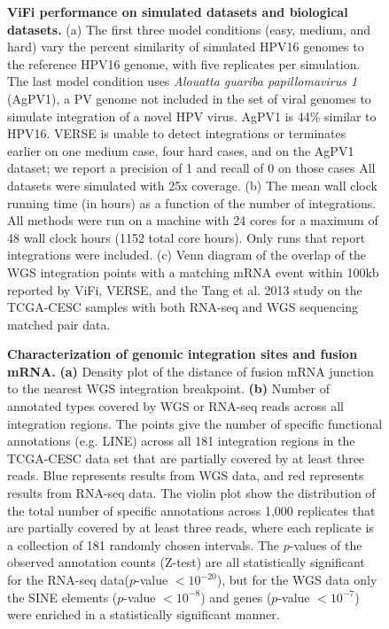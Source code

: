 \documentclass[a4,center,fleqn]{NAR}
\begin{document}
 \begin{figure}[htpb]
  \centering
\caption[ViFi performance simulated datasets.]  {\label{sim_results}
  {\bf ViFi performance on simulated datasets and biological
    datasets.}  (a) The first three model conditions (easy, medium,
  and hard) vary the percent similarity of simulated HPV16 genomes to
  the reference HPV16 genome, with five replicates per simulation.
  The last model condition uses \textit{Alouatta guariba
    papillomavirus 1} (AgPV1), a PV genome not included in the set of
  viral genomes to simulate integration of a novel HPV virus.  AgPV1 is
  44\% similar to HPV16.  VERSE is unable to detect integrations or
  terminates earlier on one medium case, four hard cases, and on the
  AgPV1 dataset; we report a precision of 1 and recall of 0 on those
  cases  All datasets were simulated with 25x coverage.  (b) The mean wall clock running time
  (in hours) as a function of the number of integrations.  All methods
  were run on a machine with 24 cores for a maximum of 48 wall clock hours (1152 total core hours).  Only
  runs that report integrations were included.  (c) Venn diagram of
  the overlap of the WGS integration points with a matching mRNA event
  within 100kb reported by ViFi, VERSE, and the Tang et al. 2013 study
  on the TCGA-CESC samples with both RNA-seq and WGS sequencing
  matched pair data.}
\end{figure}


\begin{figure}[htpb]
  \centering
  \caption[Analyses of genomic integration sites.]  {\label{figure2}
    \textbf{Characterization of genomic integration sites and fusion
      mRNA.} \textbf{(a)} Density plot of the distance of fusion mRNA
    junction to the nearest WGS integration breakpoint.  \textbf{(b)}
    Number of annotated types covered by WGS or RNA-seq reads across
    all integration regions.  The points give
    the number of specific functional annotations (e.g. LINE) across
    all 181 integration regions in the TCGA-CESC data set that
    are partially covered by at least three reads.  Blue represents
    results from WGS data, and red represents results from RNA-seq
    data.  The violin plot show the distribution of the total number
    of specific annotations across 1,000 replicates that are partially
    covered by at least three reads, where each replicate is a
    collection of 181 randomly chosen intervals. The $p$-values of the
    observed annotation counts (Z-test) are all statistically
    significant for the RNA-seq data($p$-value $<10^{-20}$), but for the
    WGS data only the SINE elements ($p$-value $<10^{-8}$) and genes
    ($p$-value $<10^{-7}$) were enriched in a statistically significant
    manner.}
\end{figure}
\end{document}
